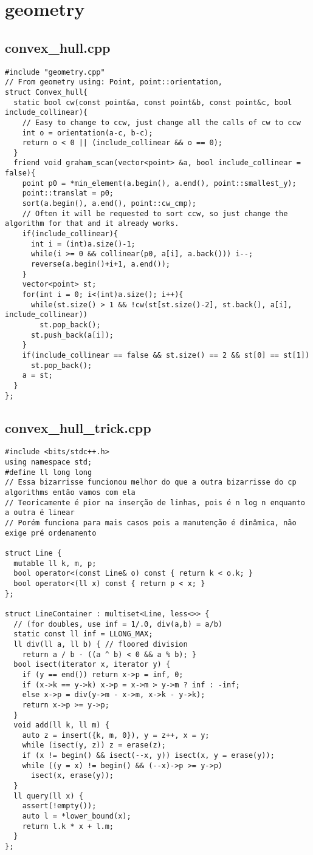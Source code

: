 \documentclass[11pt,landscape,twocolumn]{article}
\begin{document}
\section{geometry}
\subsection*{convex\_hull.cpp}
\begin{lstlisting}
#include "geometry.cpp"
// From geometry using: Point, point::orientation, 
struct Convex_hull{
  static bool cw(const point&a, const point&b, const point&c, bool include_collinear){
    // Easy to change to ccw, just change all the calls of cw to ccw
    int o = orientation(a-c, b-c);
    return o < 0 || (include_collinear && o == 0);
  }
  friend void graham_scan(vector<point> &a, bool include_collinear = false){
    point p0 = *min_element(a.begin(), a.end(), point::smallest_y);
    point::translat = p0;
    sort(a.begin(), a.end(), point::cw_cmp);
    // Often it will be requested to sort ccw, so just change the algorithm for that and it already works.
    if(include_collinear){ 
      int i = (int)a.size()-1;
      while(i >= 0 && collinear(p0, a[i], a.back())) i--;
      reverse(a.begin()+i+1, a.end());
    }
    vector<point> st;
    for(int i = 0; i<(int)a.size(); i++){
      while(st.size() > 1 && !cw(st[st.size()-2], st.back(), a[i], include_collinear))
        st.pop_back();
      st.push_back(a[i]);
    }
    if(include_collinear == false && st.size() == 2 && st[0] == st[1])
      st.pop_back();
    a = st;
  }
};
\end{lstlisting}

\subsection*{convex\_hull\_trick.cpp}
\begin{lstlisting}
#include <bits/stdc++.h>
using namespace std;
#define ll long long
// Essa bizarrisse funcionou melhor do que a outra bizarrisse do cp algorithms então vamos com ela
// Teoricamente é pior na inserção de linhas, pois é n log n enquanto a outra é linear
// Porém funciona para mais casos pois a manutenção é dinâmica, não exige pré ordenamento

struct Line {
  mutable ll k, m, p;
  bool operator<(const Line& o) const { return k < o.k; }
  bool operator<(ll x) const { return p < x; }
};

struct LineContainer : multiset<Line, less<>> {
  // (for doubles, use inf = 1/.0, div(a,b) = a/b)
  static const ll inf = LLONG_MAX;
  ll div(ll a, ll b) { // floored division
    return a / b - ((a ^ b) < 0 && a % b); }
  bool isect(iterator x, iterator y) {
    if (y == end()) return x->p = inf, 0;
    if (x->k == y->k) x->p = x->m > y->m ? inf : -inf;
    else x->p = div(y->m - x->m, x->k - y->k);
    return x->p >= y->p;
  }
  void add(ll k, ll m) {
    auto z = insert({k, m, 0}), y = z++, x = y;
    while (isect(y, z)) z = erase(z);
    if (x != begin() && isect(--x, y)) isect(x, y = erase(y));
    while ((y = x) != begin() && (--x)->p >= y->p)
      isect(x, erase(y));
  }
  ll query(ll x) {
    assert(!empty());
    auto l = *lower_bound(x);
    return l.k * x + l.m;
  }
};
\end{lstlisting}
\end{document}
